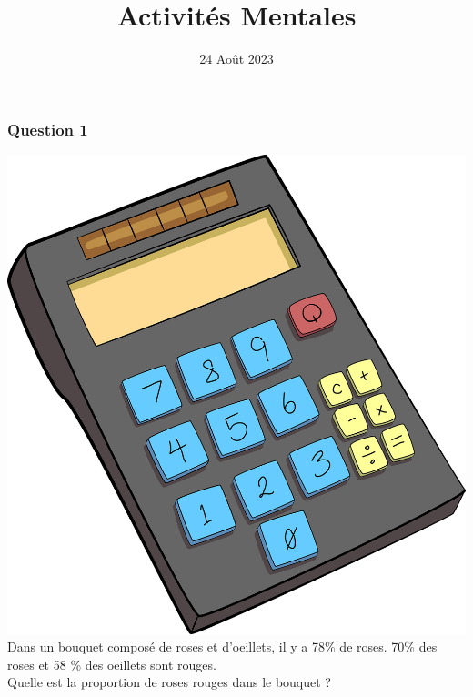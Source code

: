 \documentclass[15pt, mathserif]{beamer}
\title{Activités Mentales}
\date{24 Août 2023}
\begin{document}
\begin{frame}
    \titlepage
\end{frame}

\begin{frame} 
	\frametitle{Question 1}
 \includegraphics[scale=0.01]{calculatrice} Dans un bouquet composé de roses et d'oeillets, il y a 78\% de roses. 70\% des roses et 58 \% des oeillets sont rouges. \\ Quelle est la proportion de roses rouges dans le bouquet ?\end{frame}
\end{document}
